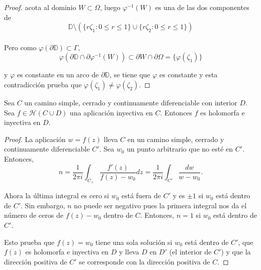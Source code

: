 \begin{proof}
acota al dominio $W \subset \Omega$, luego $\varphi ^{-1} (W)$ es una de las dos componentes de
\begin{equation*}
\mathbb{D} \setminus ( \{ r \zeta_1 : 0 \leq r \leq 1\} \cup \{ r \zeta_2 : 0 \leq r \leq 1\})
\end{equation*}
\\
Pero como $\varphi(\partial \mathbb{D}) \subset \Gamma$,
\begin{equation*}
\varphi(\partial \mathbb{D} \cap \partial \varphi ^{-1} (W)) \subset \partial W \cap \partial \Omega = \{ \varphi (\zeta_1)\}
\end{equation*}

y $\varphi$ es constante en un arco de $\partial \mathbb{D}$, se tiene que $\varphi$ es constante y esta contradicción prueba que $\varphi(\zeta_1) \not = \varphi(\zeta_2)$.
\end{proof}

\begin{theorem}
Sea $C$ un camino simple, cerrado y continuamente diferenciable con interior $D$. Sea $f \in \mathcal{H}(C \cup D)$ una aplicación inyectiva en $C$. Entonces $f$ es holomorfa e inyectiva en $D$. 
\end{theorem}

\begin{proof}
La aplicación $w = f(z)$ lleva $C$ en un camino simple, cerrado y continuamente diferenciable $C'$. Sea $w_0$ un punto arbitrario que no esté en $C'$. Entonces,
\begin{equation*}
n = \dfrac{1}{2 \pi i} \int_{C_+} \dfrac{f'(z)}{f(z) - w_0} dz =  \dfrac{1}{2 \pi i} \int_{C'} \dfrac{dw}{w - w_0}.
\end{equation*}

Ahora la última integral es cero si $w_0$ está fuera de $C'$ y es $\pm 1$ si $w_0$ está dentro de $C'$. Sin embargo, $n$ no puede ser negativo pues la primera integral nos da el número de ceros de $f(z) - w_0$ dentro de $C$. Entonces, $n=1$ si $w_0$ está dentro de $C'$.

Esto prueba que $f(z) = w_0$ tiene una sola solución si $w_0$ está dentro de $C'$, que $f(z)$ es holomorfa e inyectiva en $D$ y lleva $D$ en $D'$ (el interior de $C'$) y que la dirección positiva de $C'$ se corresponde con la dirección positiva de $C$.
\end{proof}

